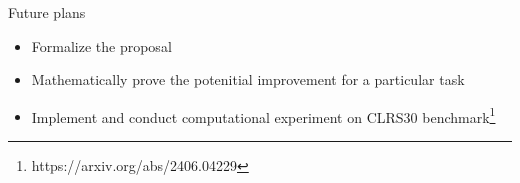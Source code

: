 \documentclass[10pt]{beamer}
\begin{document}
\begin{frame}{Future plans}
	\begin{itemize}
		\item Formalize the proposal
		\item Mathematically prove the potenitial improvement for a particular task
		\item Implement and conduct computational experiment on CLRS30 benchmark\footnote{https://arxiv.org/abs/2406.04229} 
	\end{itemize}
\end{frame}
\end{document}
